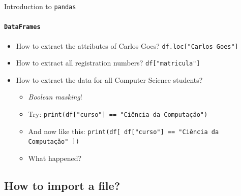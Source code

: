 \documentclass[notes,11pt, aspectratio=169, xcolor=table]{beamer}
\begin{document}
        \begin{frame}[fragile=singleslide]{Introduction to \texttt{pandas}}
        \framesubtitle{\texttt{DataFrames}}
            
             \begin{itemize}
    
                \item How to extract the attributes of Carlos Goes? \texttt{df.loc["Carlos Goes"]}

                \item How to extract all registration numbers? \texttt{df["matricula"]}
                
                \item How to extract the data for all Computer Science students?
                
                \begin{itemize}
                    \item \textit{Boolean masking}!
                    \item Try: \texttt{print(df["curso"] == "Ciência da Computação")}
                    \item And now like this: \texttt{print(df[ df["curso"] == "Ciência da Computação" ])}
                    \item What happened?
                \end{itemize}
        
            \end{itemize}             

        \end{frame}    
            
        \subsection{How to import a file?}
\end{document}
